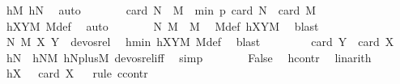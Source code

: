 \begin{isabellebody}
\ hM\ hN\ \isamarkupfalse%
\ auto\isanewline
\ \ \ \ \isamarkupfalse%
\ \isamarkupfalse%
\ {\isachardoublequoteopen}card\ {\isacharparenleft}{\kern0pt}{\isacharquery}{\kern0pt}N\ {\isasymcdots}\ {\isacharquery}{\kern0pt}M{\isacharparenright}{\kern0pt}\ {\isacharless}{\kern0pt}\ min\ p\ {\isacharparenleft}{\kern0pt}card\ {\isacharquery}{\kern0pt}N\ {\isacharplus}{\kern0pt}\ card\ {\isacharquery}{\kern0pt}M\ {\isacharminus}{\kern0pt}\ {}{\isacharparenright}{\kern0pt}{\isachardoublequoteclose}\ \isanewline
\ \ \ \ \ \ \isamarkupfalse%
\ hXYM\ M{\isacharunderscore}{\kern0pt}def\ \isamarkupfalse%
\ auto\isanewline
\ \ \ \ \isamarkupfalse%
\ \isamarkupfalse%
\ {\isachardoublequoteopen}{\isacharparenleft}{\kern0pt}{\isacharquery}{\kern0pt}N{\isacharcomma}{\kern0pt}\ {\isacharquery}{\kern0pt}M{\isacharparenright}{\kern0pt}\ {\isasymin}\ M{\isachardoublequoteclose}\ \isamarkupfalse%
\ M{\isacharunderscore}{\kern0pt}def\ hXYM\ \isamarkupfalse%
\ blast\isanewline
\ \ \ \ \isamarkupfalse%
\ \isamarkupfalse%
\ {\isachardoublequoteopen}{\isacharparenleft}{\kern0pt}{\isacharparenleft}{\kern0pt}{\isacharquery}{\kern0pt}N{\isacharcomma}{\kern0pt}\ {\isacharquery}{\kern0pt}M{\isacharparenright}{\kern0pt}{\isacharcomma}{\kern0pt}\ {\isacharparenleft}{\kern0pt}X{\isacharcomma}{\kern0pt}\ Y{\isacharparenright}{\kern0pt}{\isacharparenright}{\kern0pt}\ {\isasymnotin}\ devos{\isacharunderscore}{\kern0pt}rel{\isachardoublequoteclose}\ \isamarkupfalse%
\ hmin\ hXYM\ M{\isacharunderscore}{\kern0pt}def\ \isamarkupfalse%
\ blast\isanewline
\ \ \ \ \isamarkupfalse%
\ \isamarkupfalse%
\ {\isachardoublequoteopen}{\isasymnot}\ card\ Y\ {\isacharless}{\kern0pt}\ card\ X{\isachardoublequoteclose}\ \isamarkupfalse%
\ hN\ \ hNM\ hNplusM\ devos{\isacharunderscore}{\kern0pt}rel{\isacharunderscore}{\kern0pt}iff\ \isamarkupfalse%
\ simp\isanewline
\ \ \ \ \isamarkupfalse%
\ \isamarkupfalse%
\ False\ \isamarkupfalse%
\ hcontr\ \isamarkupfalse%
\ linarith\isanewline
\ \ \isamarkupfalse%
\isanewline
\ \ \isamarkupfalse%
\ hX{}{\isacharcolon}{\kern0pt}\ {\isachardoublequoteopen}{}\ {\isasymle}\ card\ X{\isachardoublequoteclose}\isanewline
\ \ \isamarkupfalse%
{\isacharparenleft}{\kern0pt}rule\ ccontr{\isacharparenright}{\kern0pt}\isanewline

\end{isabellebody}
